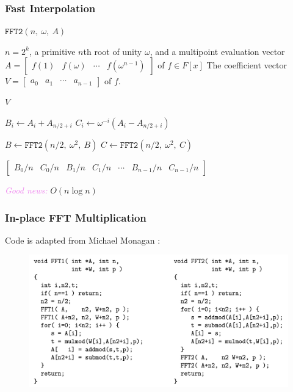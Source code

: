 \documentclass{beamer}
\newcommand{\its}[1]{\textcolor{violet}{\emph{#1}}}
\begin{document}
\begin{frame}
    \frametitle{Fast Interpolation}

    $\texttt{FFT2}(n,\ \omega,\ A)$
    \begin{algorithmic}
        \Require $n = 2^k$, a primitive $n$th root of unity $\omega$, and a
        multipoint evaluation vector $A = \begin{bmatrix} f(1) & f(\omega) &
        \cdots & f(\omega^{n - 1}) \end{bmatrix}$ of $f \in F[x]$
        \Ensure The coefficient vector $V = \begin{bmatrix} a_0 & a_1 & \cdots
        & a_{n - 1} \end{bmatrix}$ of $f$.
        \pause \vfill

         \State \Return $V$ \EndIf
        \pause \vfill

            \State $B_i \gets A_i + A_{n/2 + i}$
            \State $C_i \gets \omega^{-i}(A_i - A_{n/2 + i})$
        \EndFor
        \pause \vfill

        \State $B \gets \texttt{FFT2}(n/2,\ \omega^2,\ B)$
        \State $C \gets \texttt{FFT2}(n/2,\ \omega^2,\ C)$
        \pause \vfill

        \State \Return $\begin{bmatrix} B_0/n & C_0/n & B_1/n & C_1/n & \cdots
        & B_{n - 1}/n & C_{n - 1}/n \end{bmatrix}$
    \end{algorithmic}

    \pause \vfill

    \its{Good news:} $O(n\log n)$
\end{frame}

\begin{frame}
    \frametitle{In-place FFT Multiplication}

    Code is adapted from Michael Monagan \cite{monagan}:

    \begin{figure}[b]
        \includegraphics[width=\textwidth]{monagan.png}
    \end{figure}
\end{frame}
\end{document}
